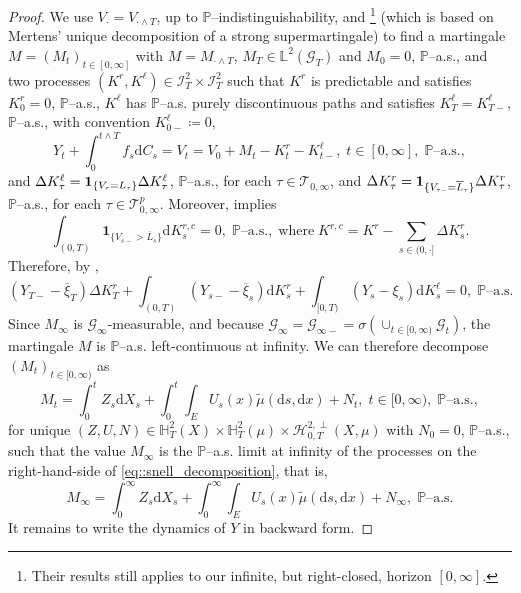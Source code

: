 \documentclass[10pt]{article} %
\newcommand\cG{\mathcal G}
\newcommand\cH{\mathcal H}
\newcommand\cI{\mathcal I}
\newcommand\cT{\mathcal T}
\newcommand{\smalltext}[1]{\text{\fontsize{4}{4}\selectfont$#1$}}
\def \H{\mathbb{H}}
\def \L{\mathbb{L}}
\def \P{\mathbb{P}}
\newcommand{\1}{\mathbf{1}}
\def\d{\mathrm{d}}
\begin{document}
\begin{proof}
	We use $V_\cdot = V_{\cdot \land T}$, up to $\P$--indistinguishability, and \cite[Lemma 3.2]{grigorova2020optimal}\footnote{Their results still applies to our infinite, but right-closed, horizon $[0,\infty]$.} (which is based on Mertens' unique decomposition of a strong supermartingale) to find a martingale $M = (M_t)_{t \in [0,\infty]}$ with $M = M_{\cdot \land T}$, $M_T \in \L^2(\cG_T)$ and $M_0 = 0$, $\P$--a.s., and two processes $(K^r,K^\ell) \in \cI^2_T \times \cI^2_T$ such that $K^r$ is predictable and satisfies $K^r_0 = 0$, $\P$--a.s., $K^\ell$ has $\P$--a.s. purely discontinuous paths and satisfies $K^\ell_T = K^\ell_{T-}$, $\P$--a.s., with convention $K^\ell_{0-} \coloneqq 0$,
	\begin{equation*}
		Y_t + \int_0^{t \land T} f_s \d C_s = V_t = V_0  + M_t - K^r_t - K^\ell_{t-}, \; t \in [0,\infty], \; \text{$\P$--a.s.},
	\end{equation*}
	and $\Delta K^\ell_\tau = \mathbf{1}_{\{V_\smalltext{\tau} = L_\smalltext{\tau}\}} \Delta K^\ell_\tau$, $\P$--a.s., for each $\tau \in \cT_{0,\infty}$, and $\Delta K^r_\tau = \mathbf{1}_{\{V_{\smalltext{\tau}\smalltext{-}} = \overline L_\smalltext{\tau}\}} \Delta K^r_\tau$, $\P$--a.s., for each $\tau \in \cT^p_{0,\infty}$. Moreover, \cite[Lemma 3.3]{grigorova2020optimal} implies
	\begin{equation*}
		\int_{(0,T)} \mathbf{1}_{\{V_{s-} > \overline L_s\}} \d K^{r,c}_s = 0, \; \text{$\P$--a.s.}, \; \text{where} \; K^{r,c} = K^r - \sum_{s \in (0,\cdot]} \Delta K^r_s.
	\end{equation*}
	Therefore, by ,
	\begin{equation*}
		(Y_{T-} - \overline\xi_T)\Delta K^r_T + \int_{(0,T)} (Y_{s-} - \overline\xi_s) \d K^r_s + \int_{[0,T)} (Y_s - \xi_s) \d K^\ell_s = 0, \; \text{$\P$--a.s.}
	\end{equation*}
	Since $M_\infty$ is $\cG_\infty$-measurable, and because $\cG_\infty = \cG_{\infty-} = \sigma(\cup_{t \in [0,\infty)}\cG_t)$, the martingale $M$ is $\P$--a.s. left-continuous at infinity. We can therefore decompose $(M_t)_{t \in [0,\infty)}$ as
	\begin{equation}\label{eq::snell_decomposition}
		M_t = \int_0^t Z_s \d X_s + \int_0^t\int_E U_s(x)\tilde\mu(\d s, \d x) + N_t, \; t \in [0,\infty), \; \text{$\P$--a.s.},
	\end{equation}
	for unique $(Z,U,N) \in \H^2_T(X) \times \H^2_T(\mu) \times \cH^{2,\perp}_{0,T}(X,\mu)$ with $N_0 = 0$, $\P$--a.s., such that the value $M_\infty$ is the $\P$--a.s. limit at infinity of the processes on the right-hand-side of \eqref{eq::snell_decomposition}, that is,
	\begin{equation*}
		M_\infty = \int_0^{\infty} Z_s \d X_s + \int_0^{\infty}\int_E U_s(x)\tilde\mu(\d s, \d x) + N_\infty, \; \text{$\P$--a.s.}
	\end{equation*}
	It remains to write the dynamics of $Y$ in backward form.
	

\end{proof}
\end{document}
